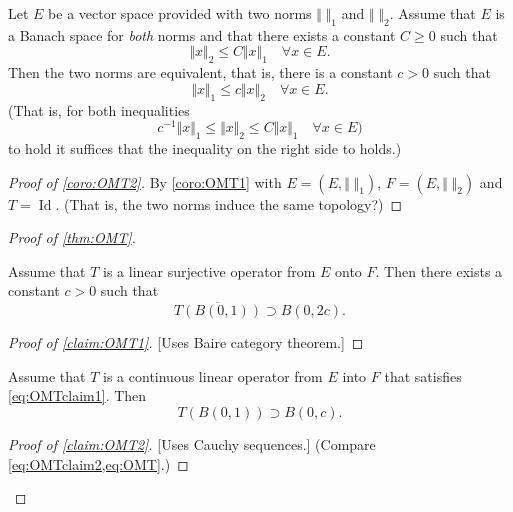 \documentclass{article}
\theoremstyle{definition}
\numberwithin{equation}{section}
\DeclareMathOperator{\Id}{Id}
\begin{document}
\begin{coro}\label{coro:OMT2}
	Let $E$ be a vector space provided with two norms $\Vert\;\Vert_1$ and $\Vert\;\Vert_2$. Assume that $E$ is a Banach space for \textit{both} norms and that there exists a constant $C\geq0$ such that
	\[\Vert x\Vert_2\leq C\Vert x\Vert_1\quad\forall x\in E.\]
	Then the two norms are equivalent, that is, there is a constant $c>0$ such that
	\[\Vert x\Vert_1\leq c\Vert x\Vert_2\quad\forall x\in E.\]
	(That is, for both inequalities
	\[c^{-1}\Vert x\Vert_1\leq \Vert x\Vert_2\leq C\Vert x\Vert_1\quad\forall x\in E)\]
	to hold it suffices that the inequality on the right side to holds.)
\end{coro}
\begin{proof}[Proof of \cref{coro:OMT2}]
	By \cref{coro:OMT1} with $E=(E,\Vert\;\Vert_1)$, $F=(E,\Vert\;\Vert_2)$ and $T=\Id$. (That is, the two norms induce the same topology?)
\end{proof}
\begin{proof}[Proof of \cref{thm:OMT}]
	\begin{claim}\label{claim:OMT1}
		Assume that $T$ is a linear surjective operator from $E$ onto $F$. Then there exists a constant $c>0$ such that
		\begin{equation}\label{eq:OMTclaim1}
			\overline{T(B(0,1))}\supset B(0,2c).
		\end{equation}
	\end{claim}
	\begin{proof}[Proof of \cref{claim:OMT1}]
		[Uses Baire category theorem.]
	\end{proof}
	\begin{claim}\label{claim:OMT2}
		Assume that $T$ is a continuous linear operator from $E$ into $F$ that satisfies \cref{eq:OMTclaim1}. Then
		\begin{equation}\label{eq:OMTclaim2}
			T(B(0,1))\supset B(0,c).
		\end{equation}
		\end{claim}
		\begin{proof}[Proof of \cref{claim:OMT2}]
			[Uses Cauchy sequences.] (Compare \cref{eq:OMTclaim2,eq:OMT}.)
		\end{proof}
\end{proof}
\end{document}
